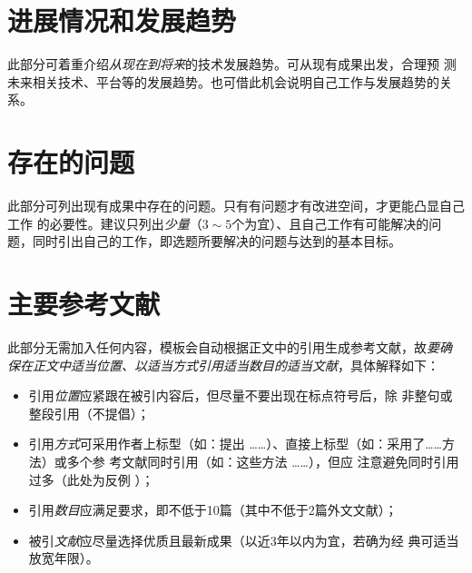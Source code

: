 \section{进展情况和发展趋势}

\begin{tcolorbox}
	此部分可着重介绍\emph{从现在到将来}的技术发展趋势。可从现有成果出发，合理预
	测未来相关技术、平台等的发展趋势。也可借此机会说明自己工作与发展趋势的关系。
\end{tcolorbox}

\section{存在的问题}

\begin{tcolorbox}
	此部分可列出现有成果中存在的问题。只有有问题才有改进空间，才更能凸显自己工作
	的必要性。建议只列出\emph{少量}（$3\sim5$个为宜）、且自己工作有可能解决的问
	题，同时引出自己的工作，即选题所要解决的问题与达到的基本目标。
\end{tcolorbox}

\section{主要参考文献}

\begin{tcolorbox}
	此部分无需加入任何内容，模板会自动根据正文中的引用生成参考文献，故\emph{要确
		保在正文中适当位置、以适当方式引用适当数目的适当文献}，具体解释如下：
	\begin{itemize}
		\item 引用\emph{位置}应紧跟在被引内容后，但尽量不要出现在标点符号后，除
		      非整句或整段引用（不提倡）；
		\item 引用\emph{方式}可采用作者上标型（如：\citet{chen1980zhongguo}提出
		      ……）、直接上标型（如：采用了……方法\citep{chen2005zhulu}）或多个参
		      考文献同时引用（如：这些方法
		      \citep{Bohan1928,chu2004tushu,Dubrovin1906,hls2012jinji}……），但应
		      注意避免同时引用过多（此处为反例
		      \citep{yuan2012lana,yuan2012lanb,yuan2012lanc,wikibook2014latex,walls2013drought,stamerjohanns2009mathml,niu2013zonghe,lamport1986document}）；
		\item 引用\emph{数目}应满足要求，即不低于10篇（其中不低于2篇外文文献）；
		\item 被引\emph{文献}应尽量选择优质且最新成果（以近3年以内为宜，若确为经
		      典可适当放宽年限）。
	\end{itemize}
\end{tcolorbox}

